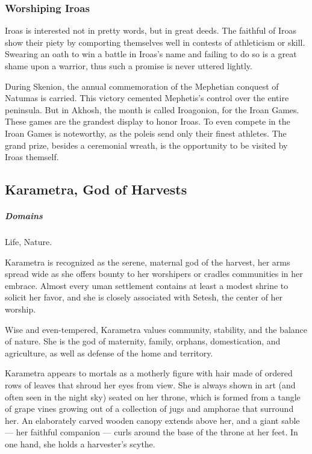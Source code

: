     \subsubsection{Worshiping Iroas}
        Iroas is interested not in pretty words, but in great deeds.
        The faithful of Iroas show their piety by comporting themselves well in contests of athleticism or skill.
        Swearing an oath to win a battle in Iroas's name and failing to do so is a great shame upon a warrior, thus such a promise is never uttered lightly.

        During Skenion, the annual commemoration of the Mephetian conquest of Natumas is carried.
        This victory cemented Mephetis's control over the entire peninsula.
        But in Akhosh, the month is called Iroagonion, for the Iroan Games.
        These games are the grandest display to honor Iroas.
        To even compete in the Iroan Games is noteworthy, as the poleis send only their finest athletes.
        The grand prize, besides a ceremonial wreath, is the opportunity to be visited by Iroas themself.

\subsection*{Karametra, God of Harvests} \label{ssec::karametra}
    \subparagraph{Domains} Life, Nature.

    Karametra is recognized as the serene, maternal god of the harvest, her arms spread wide as she offers bounty to her worshipers or cradles communities in her embrace.
    Almost every uman settlement contains at least a modest shrine to solicit her favor, and she is closely associated with Setesh, the center of her worship.

    Wise and even-tempered, Karametra values community, stability, and the balance of nature.
    She is the god of maternity, family, orphans, domestication, and agriculture, as well as defense of the home and territory.

    Karametra appears to mortals as a motherly figure with hair made of ordered rows of leaves that shroud her eyes from view.
    She is always shown in art (and often seen in the night sky) seated on her throne, which is formed from a tangle of grape vines growing out of a collection of jugs and amphorae that surround her.
    An elaborately carved wooden canopy extends above her, and a giant sable --- her faithful companion --- curls around the base of the throne at her feet.
    In one hand, she holds a harvester's scythe.

